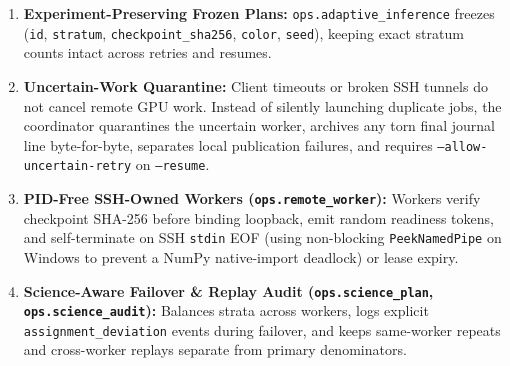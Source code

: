\documentclass[11pt,a4paper]{article}
\begin{document}
\begin{enumerate}
  \item \textbf{Experiment-Preserving Frozen Plans:} \texttt{ops.adaptive\_inference} freezes (\texttt{id}, \texttt{stratum}, \texttt{checkpoint\_sha256}, \texttt{color}, \texttt{seed}), keeping exact stratum counts intact across retries and resumes.
  \item \textbf{Uncertain-Work Quarantine:} Client timeouts or broken SSH tunnels do not cancel remote GPU work. Instead of silently launching duplicate jobs, the coordinator quarantines the uncertain worker, archives any torn final journal line byte-for-byte, separates local publication failures, and requires \texttt{--allow-uncertain-retry} on \texttt{--resume}.
  \item \textbf{PID-Free SSH-Owned Workers (\texttt{ops.remote\_worker}):} Workers verify checkpoint SHA-256 before binding loopback, emit random readiness tokens, and self-terminate on SSH \texttt{stdin} EOF (using non-blocking \texttt{PeekNamedPipe} on Windows to prevent a NumPy native-import deadlock) or lease expiry.
  \item \textbf{Science-Aware Failover \& Replay Audit (\texttt{ops.science\_plan}, \texttt{ops.science\_audit}):} Balances strata across workers, logs explicit \texttt{assignment\_deviation} events during failover, and keeps same-worker repeats and cross-worker replays separate from primary denominators.
\end{enumerate}
\end{document}
